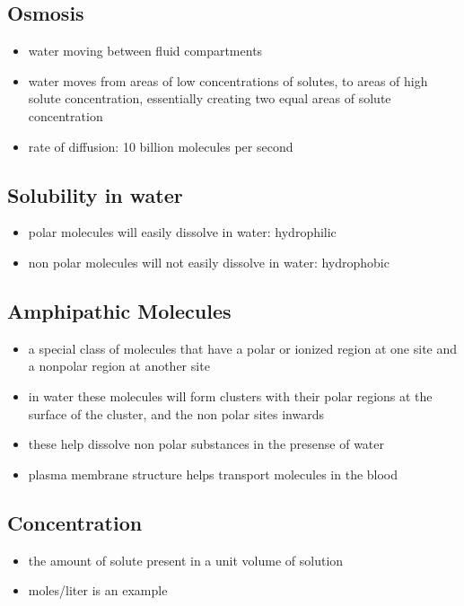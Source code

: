 \documentclass[11pt]{article}
\begin{document}
\subsection{Osmosis}
\label{sec:orgd964fba}
\begin{itemize}
\item water moving between fluid compartments
\item water moves from areas of low concentrations of solutes, to areas of high solute concentration, essentially creating two equal areas of solute concentration
\item rate of diffusion: 10 billion molecules per second
\end{itemize}
\subsection{Solubility in water}
\label{sec:orgb5c65cb}
\begin{itemize}
\item polar molecules will easily dissolve in water: hydrophilic
\item non polar molecules will not easily dissolve in water: hydrophobic
\end{itemize}
\subsection{Amphipathic Molecules}
\label{sec:orgb8f9d54}
\begin{itemize}
\item a special class of molecules that have a polar or ionized region at one site and a nonpolar region at another site
\item in water these molecules will form clusters with their polar regions at the surface of the cluster, and the non polar sites inwards
\item these help dissolve non polar substances in the presense of water
\item plasma membrane structure helps transport molecules in the blood
\end{itemize}
\subsection{Concentration}
\label{sec:org7c57085}
\begin{itemize}
\item the amount of solute present in a unit volume of solution
\item moles/liter is an example
\end{itemize}
\end{document}
